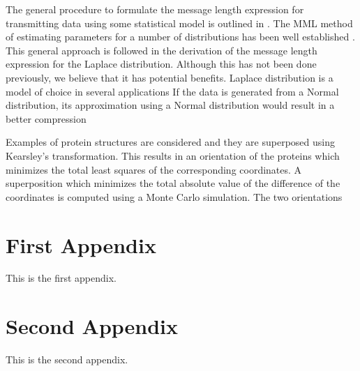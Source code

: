 \documentclass[wcp]{jmlr}
\begin{document}
The general procedure to formulate the message length expression for transmitting
data using some statistical model is outlined in \citet{wallace-87}. The MML method
of estimating parameters for a number of distributions has been well established
\citep{WallaceBook}. This general approach is followed in the derivation of the
message length expression for the Laplace distribution. Although this has not been
done previously, we believe that it has potential benefits. Laplace distribution
is a model of choice in several applications
If the data is generated from a Normal distribution, its approximation using a Normal
distribution would result in a better compression

Examples of protein structures are considered
and they are superposed using Kearsley's transformation. This results in an
orientation of the proteins which minimizes the total least squares of the
corresponding coordinates. A superposition which minimizes the total absolute 
value of the difference of the coordinates is computed using a Monte Carlo 
simulation. The two orientations 




\appendix

\section{First Appendix}\label{apd:first}

This is the first appendix.

\section{Second Appendix}\label{apd:second}

This is the second appendix.
\end{document}
